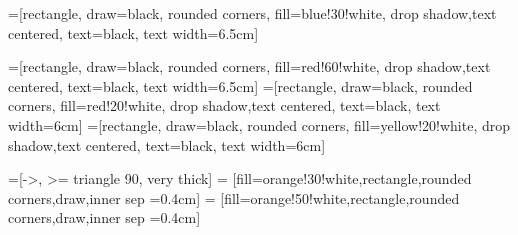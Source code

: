 
=[rectangle, draw=black, rounded corners, fill=blue!30!white, drop shadow,text centered, text=black, text width=6.5cm]

=[rectangle, draw=black, rounded corners, fill=red!60!white, drop shadow,text centered, text=black, text width=6.5cm]
=[rectangle, draw=black, rounded corners, fill=red!20!white, drop shadow,text centered, text=black, text width=6cm]
=[rectangle, draw=black, rounded corners, fill=yellow!20!white, drop shadow,text centered, text=black, text width=6cm]

=[->, >= triangle 90, very thick]
 = [fill=orange!30!white,rectangle,rounded corners,draw,inner sep =0.4cm]
 = [fill=orange!50!white,rectangle,rounded corners,draw,inner sep =0.4cm]


